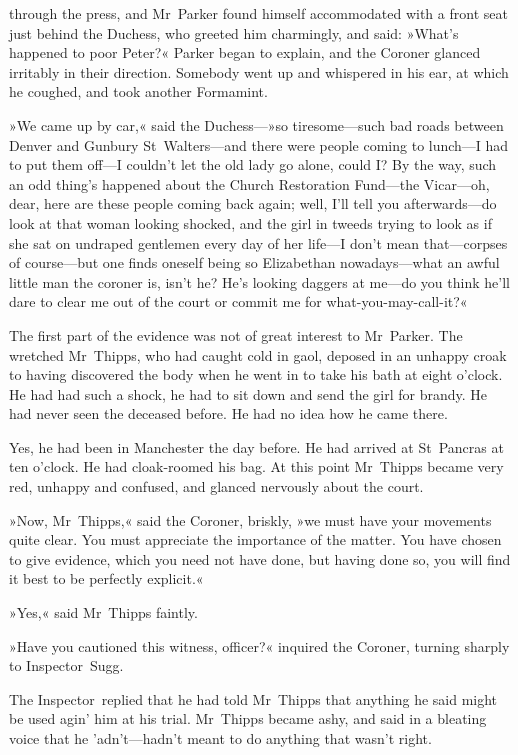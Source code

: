 through the press, and Mr~Parker found himself accommodated with a front seat just behind the Duchess, who greeted him charmingly, and said: »What's happened to poor Peter?« Parker began to explain, and the Coroner glanced irritably in their direction. Somebody went up and whispered in his ear, at which he coughed, and took another Formamint.

»We came up by car,« said the Duchess---»so tiresome—such bad roads between Denver and Gunbury St~Walters—and there were people coming to lunch—I had to put them off—I couldn't let the old lady go alone, could I? By the way, such an odd thing's happened about the Church Restoration Fund—the Vicar—oh, dear, here are these people coming back again; well, I'll tell you afterwards—do look at that woman looking shocked, and the girl in tweeds trying to look as if she sat on undraped gentlemen every day of her life—I don't mean that—corpses of course—but one finds oneself being so Elizabethan nowadays—what an awful little man the coroner is, isn't he? He's looking daggers at me—do you think he'll dare to clear me out of the court or commit me for what-you-may-call-it?«

The first part of the evidence was not of great interest to Mr~Parker. The wretched Mr~Thipps, who had caught cold in gaol, deposed in an unhappy croak to having discovered the body when he went in to take his bath at eight o'clock. He had had such a shock, he had to sit down and send the girl for brandy. He had never seen the deceased before. He had no idea how he came there.

Yes, he had been in Manchester the day before. He had arrived at St~Pancras at ten o'clock. He had cloak-roomed his bag. At this point Mr~Thipps became very red, unhappy and confused, and glanced nervously about the court.

»Now, Mr~Thipps,« said the Coroner, briskly, »we must have your movements quite clear. You must appreciate the importance of the matter. You have chosen to give evidence, which you need not have done, but having done so, you will find it best to be perfectly explicit.«

»Yes,« said Mr~Thipps faintly.

»Have you cautioned this witness, officer?« inquired the Coroner, turning sharply to Inspector~Sugg.

The Inspector~replied that he had told Mr~Thipps that anything he said might be used agin' him at his trial. Mr~Thipps became ashy, and said in a bleating voice that he 'adn't—hadn't meant to do anything that wasn't right.

